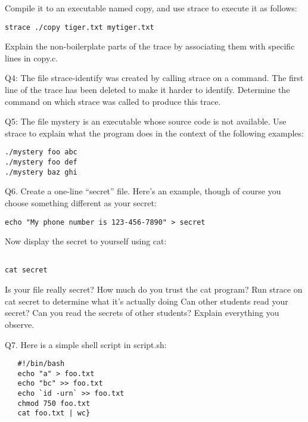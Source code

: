 \documentclass[11pt]{report}
\begin{document}
Compile it to an executable named copy, and use strace to execute it as follows: 
\begin{verbatim}
strace ./copy tiger.txt mytiger.txt
\end{verbatim}

Explain the non-boilerplate parts of the trace by associating them with specific lines in copy.c. 

\vspace{0.1in}
\noindent
Q4: The file strace-identify was created by calling strace on a command. The first line of the trace has been deleted to make it harder to identify. Determine the command on which strace was called to produce this trace. 

\vspace{0.1in}
\noindent
Q5: The file mystery is an executable whose source code is not available.  Use strace to explain what the program does in the context of the following examples:
\begin{verbatim}
./mystery foo abc 
./mystery foo def 
./mystery baz ghi
\end{verbatim}



\vspace{0.1in}
\noindent
Q6.  Create a one-line ``secret'' file.  Here’s an example, though of course you choose something different as your secret: 

\begin{verbatim}
echo "My phone number is 123-456-7890" > secret
\end{verbatim}

Now display the secret to yourself using cat: 
\begin{verbatim}

cat secret
\end{verbatim}

Is your file really secret?  How much do you trust the cat program?  Run strace on cat secret to determine what it’s actually doing  Can other students read your secret? Can you read the secrets of other students? Explain everything you observe. 


\vspace{0.1in}
\noindent
Q7.  Here is a simple shell script in script.sh:

\begin{verbatim}
   #!/bin/bash
   echo "a" > foo.txt
   echo "bc" >> foo.txt
   echo `id -urn` >> foo.txt
   chmod 750 foo.txt
   cat foo.txt | wc}
\end{verbatim}
\end{document}
